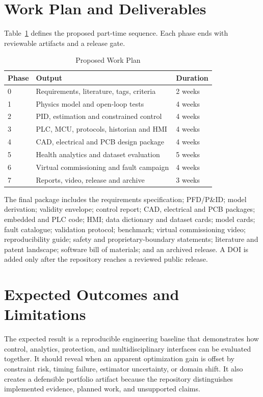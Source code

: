 \documentclass[conference]{IEEEtran}
\begin{document}
\section{Work Plan and Deliverables}
Table~\ref{tab:plan} defines the proposed part-time sequence. Each phase ends with reviewable artifacts and a release gate.

\begin{table}[t]
\caption{Proposed Work Plan}
\label{tab:plan}
\centering
\footnotesize
\begin{tabular}{p{}p{}p{}}
\toprule
Phase & Output & Duration \\
\midrule
0 & Requirements, literature, tags, criteria & 2 weeks \\
1 & Physics model and open-loop tests & 4 weeks \\
2 & PID, estimation and constrained control & 4 weeks \\
3 & PLC, MCU, protocols, historian and HMI & 4 weeks \\
4 & CAD, electrical and PCB design package & 4 weeks \\
5 & Health analytics and dataset evaluation & 5 weeks \\
6 & Virtual commissioning and fault campaign & 4 weeks \\
7 & Reports, video, release and archive & 3 weeks \\
\bottomrule
\end{tabular}
\end{table}

The final package includes the requirements specification; PFD/P\&ID; model derivation; validity envelope; control report; CAD, electrical and PCB packages; embedded and PLC code; HMI; data dictionary and dataset cards; model cards; fault catalogue; validation protocol; benchmark; virtual commissioning video; reproducibility guide; safety and proprietary-boundary statements; literature and patent landscape; software bill of materials; and an archived release. A DOI is added only after the repository reaches a reviewed public release.

\section{Expected Outcomes and Limitations}
The expected result is a reproducible engineering baseline that demonstrates how control, analytics, protection, and multidisciplinary interfaces can be evaluated together. It should reveal when an apparent optimization gain is offset by constraint risk, timing failure, estimator uncertainty, or domain shift. It also creates a defensible portfolio artifact because the repository distinguishes implemented evidence, planned work, and unsupported claims.
\end{document}
